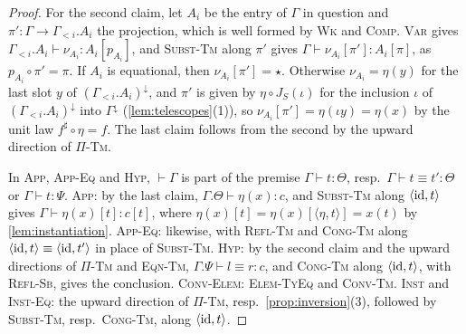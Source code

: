 \begin{proof}
    For the second claim, let $A_i$ be the entry of $\Gamma$ in question and $\pi' : \Gamma \to \Gamma_{<i}.A_i$ the projection, which is well formed by \textsc{Wk} and \textsc{Comp}. \textsc{Var} gives $\Gamma_{<i}.A_i \vdash \nu_{A_i} : A_i[p_{A_i}]$, and \textsc{Subst-Tm} along $\pi'$ gives $\Gamma \vdash \nu_{A_i}[\pi'] : A_i[\pi]$, as $p_{A_i} \circ \pi' = \pi$. If $A_i$ is equational, then $\nu_{A_i}[\pi'] = \star$. Otherwise $\nu_{A_i} = \eta(y)$ for the last slot $y$ of $(\Gamma_{<i}.A_i)^{\downarrow}$, and $\pi'$ is given by $\eta \circ J_S(\iota)$ for the inclusion $\iota$ of $(\Gamma_{<i}.A_i)^{\downarrow}$ into $\Gamma^{\downarrow}$ (\cref{lem:telescopes}(1)), so $\nu_{A_i}[\pi'] = \eta(\iota y) = \eta(x)$ by the unit law $f^\sharp \circ \eta = f$. The last claim follows from the second by the upward direction of \textsc{$\Pi$-Tm}.

    In \textsc{App}, \textsc{App-Eq} and \textsc{Hyp}, $\vdash \Gamma$ is part of the premise $\Gamma \vdash t : \Theta$, resp.\ $\Gamma \vdash t \equiv t' : \Theta$ or $\Gamma \vdash t : \Psi$. \textsc{App}: by the last claim, $\Gamma.\Theta \vdash \eta(x) : c$, and \textsc{Subst-Tm} along $\langle \mathrm{id}, t \rangle$ gives $\Gamma \vdash \eta(x)[t] : c[t]$, where $\eta(x)[t] = \eta(x)[\langle \eta, t \rangle] = x(t)$ by \cref{lem:instantiation}. \textsc{App-Eq}: likewise, with \textsc{Refl-Tm} and \textsc{Cong-Tm} along $\langle \mathrm{id}, t \rangle \equiv \langle \mathrm{id}, t' \rangle$ in place of \textsc{Subst-Tm}. \textsc{Hyp}: by the second claim and the upward directions of \textsc{$\Pi$-Tm} and \textsc{Eqn-Tm}, $\Gamma.\Psi \vdash l \equiv r : c$, and \textsc{Cong-Tm} along $\langle \mathrm{id}, t \rangle$, with \textsc{Refl-Sb}, gives the conclusion. \textsc{Conv-Elem}: \textsc{Elem-TyEq} and \textsc{Conv-Tm}. \textsc{Inst} and \textsc{Inst-Eq}: the upward direction of \textsc{$\Pi$-Tm}, resp.\ \cref{prop:inversion}(3), followed by \textsc{Subst-Tm}, resp.\ \textsc{Cong-Tm}, along $\langle \mathrm{id}, t \rangle$.
\end{proof}

